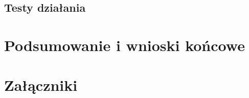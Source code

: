 \documentclass[12pt,twoside]{article}
\begin{document}
\subsection{Testy działania}
\clearpage

\section{Podsumowanie i wnioski końcowe}
\clearpage

\section*{Załączniki}

\clearpage


\begin{thebibliography}{4}
\end{thebibliography}

\clearpage

\makesummary
\end{document}
